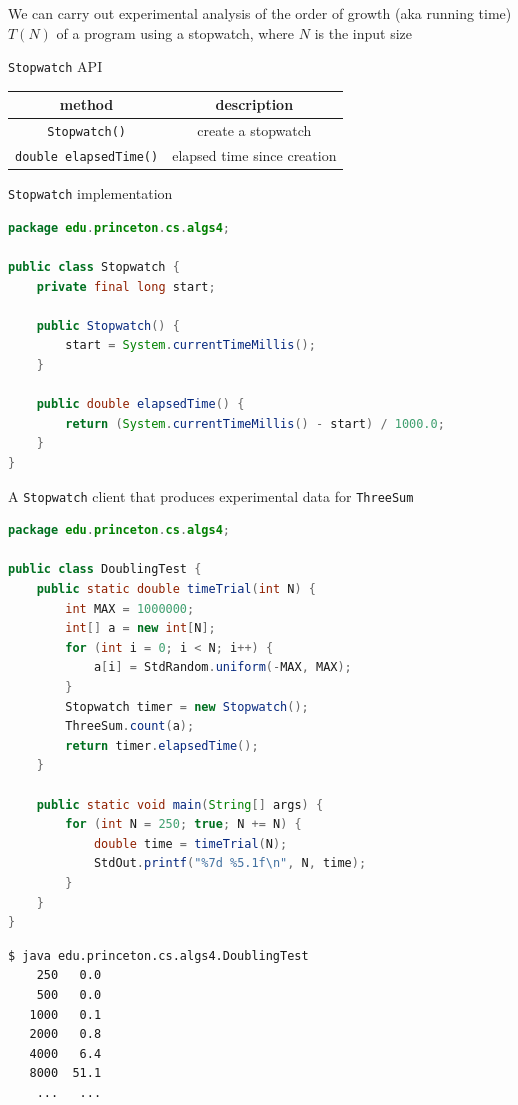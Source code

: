 \documentclass[8pt,a4paper,compress]{beamer}
\begin{document}
\begin{frame}[fragile]
\pause

We can carry out experimental analysis of the order of growth (aka running time) $T(N)$ of a program using a stopwatch, where $N$ is the input size

\pause\bigskip

\lstinline{Stopwatch} API
\begin{center}
\begin{tabular}{cc}
method & description \\ \hline
\lstinline$Stopwatch()$ & create a stopwatch \\
\lstinline$double elapsedTime()$ & elapsed time since creation
\end{tabular} 
\end{center}

\pause\bigskip

\lstinline{Stopwatch} implementation

\smallskip

\begin{lstlisting}[language=Java,style=focusin]
package edu.princeton.cs.algs4;

public class Stopwatch {
    private final long start;
    
    public Stopwatch() { 
        start = System.currentTimeMillis(); 
    }
    
    public double elapsedTime() {
        return (System.currentTimeMillis() - start) / 1000.0;
    }
}
\end{lstlisting}
\end{frame}

\begin{frame}[fragile]
\pause

A \lstinline{Stopwatch} client that produces experimental data for \lstinline{ThreeSum}

\smallskip

\begin{lstlisting}[language=Java,style=focusin]
package edu.princeton.cs.algs4;

public class DoublingTest {
    public static double timeTrial(int N) {
        int MAX = 1000000;
        int[] a = new int[N];
        for (int i = 0; i < N; i++) {
            a[i] = StdRandom.uniform(-MAX, MAX);
        }
        Stopwatch timer = new Stopwatch();
        ThreeSum.count(a);
        return timer.elapsedTime();
    }

    public static void main(String[] args) { 
        for (int N = 250; true; N += N) {
            double time = timeTrial(N);
            StdOut.printf("%7d %5.1f\n", N, time);
        } 
    } 
} 
\end{lstlisting}

\pause\smallskip

\begin{lstlisting}[language={},style=focusin]
$ java edu.princeton.cs.algs4.DoublingTest
    250   0.0
    500   0.0
   1000   0.1
   2000   0.8
   4000   6.4
   8000  51.1
    ...   ...
\end{lstlisting}
\end{frame}
\end{document}
